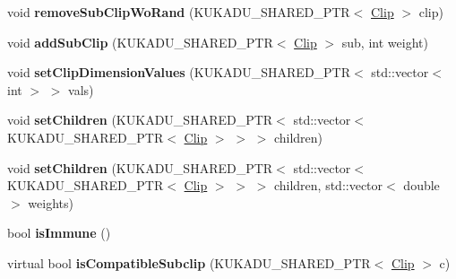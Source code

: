 \begin{DoxyCompactItemize}
\item 
\hypertarget{classkukadu_1_1Clip_afc489cc62a302b2a679374b4617e5a31}{void {\bfseries remove\-Sub\-Clip\-Wo\-Rand} (K\-U\-K\-A\-D\-U\-\_\-\-S\-H\-A\-R\-E\-D\-\_\-\-P\-T\-R$<$ \hyperlink{classkukadu_1_1Clip}{Clip} $>$ clip)}\label{classkukadu_1_1Clip_afc489cc62a302b2a679374b4617e5a31}

\item 
\hypertarget{classkukadu_1_1Clip_a2247e017be36476075ce9ce68358e53d}{void {\bfseries add\-Sub\-Clip} (K\-U\-K\-A\-D\-U\-\_\-\-S\-H\-A\-R\-E\-D\-\_\-\-P\-T\-R$<$ \hyperlink{classkukadu_1_1Clip}{Clip} $>$ sub, int weight)}\label{classkukadu_1_1Clip_a2247e017be36476075ce9ce68358e53d}

\item 
\hypertarget{classkukadu_1_1Clip_af56ce79b2094de5bcab46642bad5d817}{void {\bfseries set\-Clip\-Dimension\-Values} (K\-U\-K\-A\-D\-U\-\_\-\-S\-H\-A\-R\-E\-D\-\_\-\-P\-T\-R$<$ std\-::vector$<$ int $>$ $>$ vals)}\label{classkukadu_1_1Clip_af56ce79b2094de5bcab46642bad5d817}

\item 
\hypertarget{classkukadu_1_1Clip_a088ed28a35cf7c00f4fff1fa62936cd0}{void {\bfseries set\-Children} (K\-U\-K\-A\-D\-U\-\_\-\-S\-H\-A\-R\-E\-D\-\_\-\-P\-T\-R$<$ std\-::vector$<$ K\-U\-K\-A\-D\-U\-\_\-\-S\-H\-A\-R\-E\-D\-\_\-\-P\-T\-R$<$ \hyperlink{classkukadu_1_1Clip}{Clip} $>$ $>$ $>$ children)}\label{classkukadu_1_1Clip_a088ed28a35cf7c00f4fff1fa62936cd0}

\item 
\hypertarget{classkukadu_1_1Clip_aaf2e88408e9b5d7001ca8563b8a1abdf}{void {\bfseries set\-Children} (K\-U\-K\-A\-D\-U\-\_\-\-S\-H\-A\-R\-E\-D\-\_\-\-P\-T\-R$<$ std\-::vector$<$ K\-U\-K\-A\-D\-U\-\_\-\-S\-H\-A\-R\-E\-D\-\_\-\-P\-T\-R$<$ \hyperlink{classkukadu_1_1Clip}{Clip} $>$ $>$ $>$ children, std\-::vector$<$ double $>$ weights)}\label{classkukadu_1_1Clip_aaf2e88408e9b5d7001ca8563b8a1abdf}

\item 
\hypertarget{classkukadu_1_1Clip_a3f1ecbecfc7d21c19e12ccfcafdad8f6}{bool {\bfseries is\-Immune} ()}\label{classkukadu_1_1Clip_a3f1ecbecfc7d21c19e12ccfcafdad8f6}

\item 
\hypertarget{classkukadu_1_1Clip_a13473decc67ef399684148824adc087c}{virtual bool {\bfseries is\-Compatible\-Subclip} (K\-U\-K\-A\-D\-U\-\_\-\-S\-H\-A\-R\-E\-D\-\_\-\-P\-T\-R$<$ \hyperlink{classkukadu_1_1Clip}{Clip} $>$ c)}\label{classkukadu_1_1Clip_a13473decc67ef399684148824adc087c}


\end{DoxyCompactItemize}
